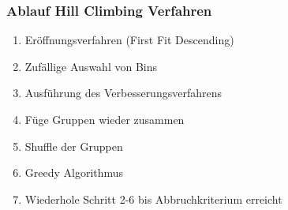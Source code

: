 \documentclass{beamer}
\begin{document}
\begin{frame}
\frametitle{Ablauf Hill Climbing Verfahren}
\begin{footnotesize}
\begin{enumerate}
\item Eröffnungsverfahren (First Fit Descending)
\item Zufällige Auswahl von Bins 
\item Ausführung des Verbesserungsverfahrens
\item Füge Gruppen wieder zusammen
\item Shuffle der Gruppen
\item Greedy Algorithmus
\item Wiederhole Schritt 2-6 bis Abbruchkriterium erreicht
\end{enumerate}
\end{footnotesize}
\end{frame}
\end{document}
